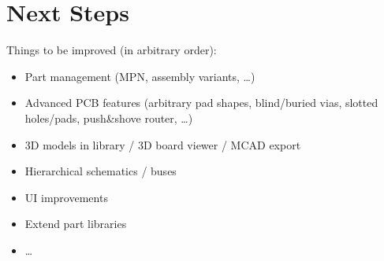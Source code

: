 \section{Next Steps}

\begin{frame}{\secname}
  Things to be improved (in arbitrary order):
  \begin{itemize}
    \item Part management (MPN, assembly variants, \ldots)
    \item Advanced PCB features (arbitrary pad shapes, blind/buried vias,
          slotted holes/pads, push\&shove router, \ldots)
    \item 3D models in library / 3D board viewer / MCAD export
    \item Hierarchical schematics / buses
    \item UI improvements
    \item Extend part libraries
    \item \ldots
  \end{itemize}
\end{frame}
